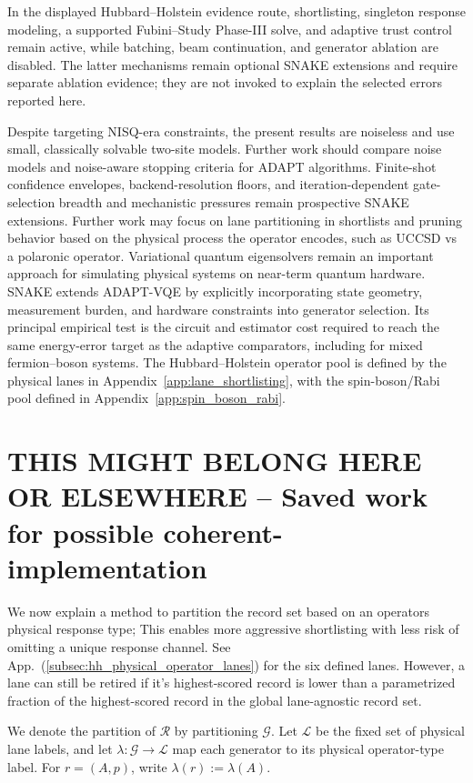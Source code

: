 \documentclass[
  reprint,
  amsmath,
  amssymb,
  aps,
  pra,
  nofootinbib,
  superscriptaddress,
  floatfix
]{revtex4-2}
\begin{document}
In the displayed Hubbard--Holstein evidence route, shortlisting, singleton response modeling, a supported Fubini--Study Phase-III solve, and adaptive trust control remain active, while batching, beam continuation, and generator ablation are disabled. The latter mechanisms remain optional SNAKE extensions and require separate ablation evidence; they are not invoked to explain the selected errors reported here.

Despite targeting NISQ-era constraints, the present results are noiseless and use small, classically solvable two-site models. Further work should compare noise models and noise-aware stopping criteria for ADAPT algorithms. Finite-shot confidence envelopes, backend-resolution floors, and iteration-dependent gate-selection breadth and mechanistic pressures remain prospective SNAKE extensions. Further work may focus on lane partitioning in shortlists and pruning behavior based on the physical process the operator encodes, such as UCCSD vs a polaronic operator.
Variational quantum eigensolvers remain an important approach for simulating physical systems on near-term quantum hardware. SNAKE extends ADAPT-VQE by explicitly incorporating state geometry, measurement burden, and hardware constraints into generator selection. Its principal empirical test is the circuit and estimator cost required to reach the same energy-error target as the adaptive comparators, including for mixed fermion--boson systems. The Hubbard--Holstein operator pool is defined by the physical lanes in Appendix~\ref{app:lane_shortlisting}, with the spin-boson/Rabi pool defined in Appendix~\ref{app:spin_boson_rabi}.

\appendix
\section{THIS MIGHT BELONG HERE OR ELSEWHERE -- Saved work for possible coherent-implementation}

We now explain a method to partition the record set based on an operators physical response type; This enables more aggressive shortlisting with less risk of omitting a unique response channel. See App.~(\ref{subsec:hh_physical_operator_lanes}) for the six defined lanes. However, a lane can still be retired if it's highest-scored record is lower than a parametrized fraction of the highest-scored record in the global lane-agnostic record set.

We denote the partition of \(\mathcal R\) by partitioning \(\mathcal G\). Let \(\mathcal L\) be the fixed set of
physical lane labels, and let \(\lambda:\mathcal G\to\mathcal L\) map each
generator to its physical operator-type label. For \(r=(A,p)\), write
\(\lambda(r):=\lambda(A)\).
\end{document}
